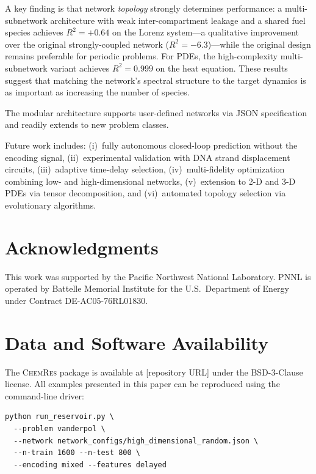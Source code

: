 \documentclass[11pt,twocolumn]{article}
\newcommand{\software}{\textsc{ChemRes}}
\begin{document}
A key finding is that network \emph{topology} strongly determines performance:
a multi-subnetwork architecture with weak inter-compartment leakage and a
shared fuel species achieves $R^2 = +0.64$ on the Lorenz system---a
qualitative improvement over the original strongly-coupled network
($R^2 = -6.3$)---while the original design remains preferable for periodic
problems.  For PDEs, the high-complexity multi-subnetwork variant achieves
$R^2 = 0.999$ on the heat equation.  These results suggest that matching the
network's spectral structure to the target dynamics is as important as
increasing the number of species.

The modular architecture supports user-defined
networks via JSON specification and readily extends to new problem classes.

Future work includes: (i)~fully autonomous closed-loop prediction without
the encoding signal, (ii)~experimental validation with DNA strand
displacement circuits, (iii)~adaptive time-delay selection,
(iv)~multi-fidelity optimization combining low- and high-dimensional
networks, (v)~extension to 2-D and 3-D PDEs via tensor decomposition,
and (vi)~automated topology selection via evolutionary algorithms.

\section*{Acknowledgments}

This work was supported by the Pacific Northwest National Laboratory.
PNNL is operated by Battelle Memorial Institute for the U.S.\ Department
of Energy under Contract DE-AC05-76RL01830.

\section*{Data and Software Availability}

The \software{} package is available at [repository URL] under the
BSD-3-Clause license.  All examples presented in this paper can be reproduced
using the command-line driver:

\begin{verbatim}
python run_reservoir.py \
  --problem vanderpol \
  --network network_configs/high_dimensional_random.json \
  --n-train 1600 --n-test 800 \
  --encoding mixed --features delayed
\end{verbatim}
\end{document}
